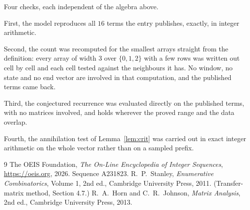 \documentclass[11pt,a4paper]{article}
\theoremstyle{plain}
\theoremstyle{definition}
\begin{document}
Four checks, each independent of the algebra above.

First, the model reproduces all $16$ terms the entry publishes, exactly, in integer
arithmetic.

Second, the count was recomputed for the smallest arrays straight from the definition: every
array of width $3$ over $\{0,1,2\}$ with a few rows was written out cell by cell and each cell
tested against the neighbours it has. No window, no state and no end vector are involved in that
computation, and the published terms came back.

Third, the conjectured recurrence was evaluated directly on the published terms, with no
matrices involved, and holds wherever the proved range and the data overlap.

Fourth, the annihilation test of Lemma~\ref{lem:crit} was carried out in exact integer
arithmetic on the whole vector rather than on a sampled prefix.

\begin{thebibliography}{9}
 The OEIS Foundation, \emph{The On-Line Encyclopedia of Integer
Sequences}, \url{https://oeis.org}, 2026. Sequence A231823.
 R.~P.~Stanley, \emph{Enumerative Combinatorics}, Volume 1, 2nd ed.,
Cambridge University Press, 2011. (Transfer-matrix method, Section 4.7.)
 R.~A.~Horn and C.~R.~Johnson, \emph{Matrix Analysis}, 2nd ed., Cambridge
University Press, 2013.
\end{thebibliography}
\end{document}

